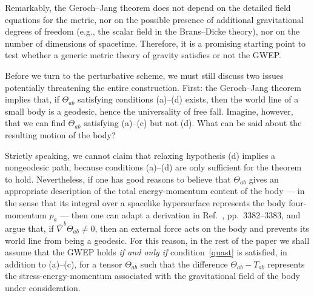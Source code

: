 \documentclass[a4paper,showkeys,aps,prd,reprint,nofootinbib,showpacs,twocolumn]{revtex4-1}
\newcommand{\eq}[1]{\( #1 \)}
\theoremstyle{plain}
\begin{document}
Remarkably, the Geroch--Jang theorem does not depend on the detailed field equations for the metric, nor on the possible presence of additional gravitational degrees of freedom (e.g., the scalar field in the Brans--Dicke theory), nor on the number of dimensions of  spacetime.  Therefore, it is a promising starting point to test whether a generic metric theory of gravity satisfies or not the GWEP.

Before we turn to the perturbative scheme, we must still discuss two issues potentially threatening the entire construction.  First: the Geroch--Jang theorem implies that, if \eq{\Theta_{ab}} satisfying conditions (a)--(d) exists, then the world line of a small body is a geodesic, hence the universality of free fall.  Imagine, however, that we can find \eq{\Theta_{ab}} satisfying (a)--(c) but not (d). What can be said about the resulting motion of the body?

Strictly speaking, we cannot claim that relaxing hypothesis (d) implies a nongeodesic path, because conditions (a)--(d) are only sufficient for the theorem to hold.  Nevertheless, if one has good reasons to believe that \eq{\Theta_{ab}} gives an appropriate description of the total energy-momentum content of the body --- in the sense that its integral over a spacelike hypersurface represents the body four-momentum \eq{p_a} --- then one can adapt a  derivation in Ref.~\cite{QuinnWald}, pp.~3382--3383, and argue that, if \eq{\bar{\nabla}^b \Theta_{ab} \neq 0}, then an external force acts on the body and prevents its world line from being a geodesic.  For this reason, in the rest of the paper we shall assume that the GWEP holds \emph{if and only if} condition~\eqref{quast} is satisfied, in addition to (a)--(c), for a tensor \eq{\Theta_{ab}} such that the difference \eq{\Theta_{ab} - T_{ab}} represents the stress-energy-momentum associated with the gravitational field of the body under consideration. 
\end{document}
